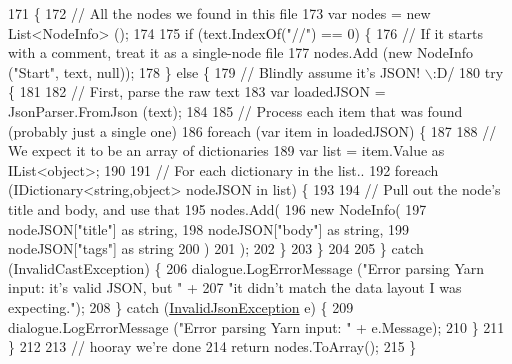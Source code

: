 \begin{DoxyCode}
171         \{
172             \textcolor{comment}{// All the nodes we found in this file}
173             var nodes = \textcolor{keyword}{new} List<NodeInfo> ();
174 
175             \textcolor{keywordflow}{if} (text.IndexOf(\textcolor{stringliteral}{"//"}) == 0) \{
176                 \textcolor{comment}{// If it starts with a comment, treat it as a single-node file}
177                 nodes.Add (\textcolor{keyword}{new} NodeInfo (\textcolor{stringliteral}{"Start"}, text, null));
178             \} \textcolor{keywordflow}{else} \{
179                 \textcolor{comment}{// Blindly assume it's JSON! \(\backslash\):D/}
180                 \textcolor{keywordflow}{try} \{
181 
182                     \textcolor{comment}{// First, parse the raw text}
183                     var loadedJSON = JsonParser.FromJson (text);
184 
185                     \textcolor{comment}{// Process each item that was found (probably just a single one)}
186                     \textcolor{keywordflow}{foreach} (var item \textcolor{keywordflow}{in} loadedJSON) \{
187 
188                         \textcolor{comment}{// We expect it to be an array of dictionaries}
189                         var list = item.Value as IList<object>;
190 
191                         \textcolor{comment}{// For each dictionary in the list..}
192                         \textcolor{keywordflow}{foreach} (IDictionary<string,object> nodeJSON \textcolor{keywordflow}{in} list) \{
193 
194                             \textcolor{comment}{// Pull out the node's title and body, and use that}
195                             nodes.Add(
196                                 \textcolor{keyword}{new} NodeInfo(
197                                     nodeJSON[\textcolor{stringliteral}{"title"}] as \textcolor{keywordtype}{string}, 
198                                     nodeJSON[\textcolor{stringliteral}{"body"}] as \textcolor{keywordtype}{string},
199                                     nodeJSON[\textcolor{stringliteral}{"tags"}] as \textcolor{keywordtype}{string}
200                                 )
201                             );
202                         \}
203                     \}
204 
205                 \} \textcolor{keywordflow}{catch} (InvalidCastException) \{
206                     dialogue.LogErrorMessage (\textcolor{stringliteral}{"Error parsing Yarn input: it's valid JSON, but "} +
207                         \textcolor{stringliteral}{"it didn't match the data layout I was expecting."});
208                 \} \textcolor{keywordflow}{catch} (\hyperlink{a00059}{InvalidJsonException} e) \{
209                     dialogue.LogErrorMessage (\textcolor{stringliteral}{"Error parsing Yarn input: "} + e.Message);
210                 \}
211             \}
212 
213             \textcolor{comment}{// hooray we're done}
214             \textcolor{keywordflow}{return} nodes.ToArray();
215         \}
\end{DoxyCode}
